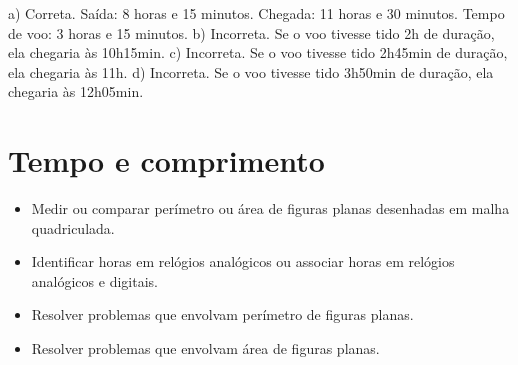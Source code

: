 a) Correta. Saída: 8 horas e 15 minutos. Chegada: 11 horas e 30 minutos. Tempo de voo: 3 horas e 15 minutos.
b) Incorreta. Se o voo tivesse tido 2h de duração, ela chegaria às 10h15min.
c) Incorreta. Se o voo tivesse tido 2h45min de duração, ela chegaria às 11h.
d) Incorreta. Se o voo tivesse tido 3h50min de duração, ela chegaria às 12h05min.


\chapter{Tempo e comprimento}


\begin{itemize}
    \item Medir ou comparar perímetro ou área de figuras planas desenhadas em
malha quadriculada.

    \item Identificar horas em relógios analógicos ou associar horas em relógios
analógicos e digitais.

    \item Resolver problemas que envolvam perímetro de figuras planas.

    \item Resolver problemas que envolvam área de figuras planas.
\end{itemize}


